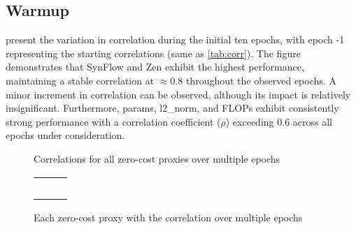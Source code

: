 \subsection{Warmup}


 present the variation in correlation during the initial ten epochs, with epoch -1 representing the starting correlations (same as \cref{tab:corr}). The figure demonstrates that SynFlow and Zen exhibit the highest performance, maintaining a stable correlation at $\approx 0.8$ throughout the observed epochs. A minor increment in correlation can be observed, although its impact is relatively insignificant. Furthermore, params, l2\_norm, and FLOPs exhibit consistently strong performance with a correlation coefficient ($\rho$) exceeding $0.6$ across all epochs under consideration.

\begin{figure}[!ht]
  \centering
  
  \caption{Correlations for all zero-cost proxies over multiple epochs}
  \label{fig:warmup}
\end{figure}

\clearpage

\begin{figure}[htbp]
  \centering
    \begin{adjustbox}{width=1.2\columnwidth,center}
  \begin{tabular}{ccc}
     &
     &
     \\
     &
     &
     \\
     &
     &
     \\
     &
     &
     \\
     &
     
  \end{tabular}
  \end{adjustbox}
  \caption{Each zero-cost proxy with the correlation over multiple epochs}
  \label{fig:warmup_seperate}
\end{figure}
